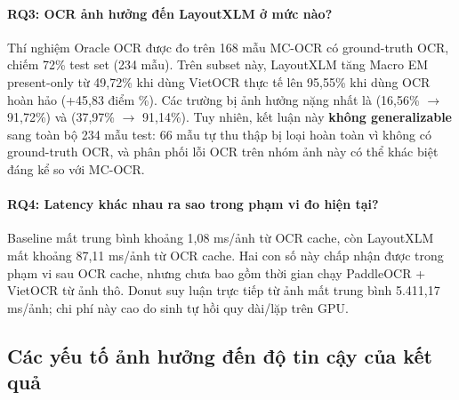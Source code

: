 \paragraph{RQ3: OCR ảnh hưởng đến LayoutXLM ở mức nào?}
Thí nghiệm Oracle OCR được đo trên 168 mẫu MC-OCR có ground-truth OCR, chiếm 72\% test set (234 mẫu). Trên subset này, LayoutXLM tăng Macro EM present-only từ 49,72\% khi dùng VietOCR thực tế lên 95,55\% khi dùng OCR hoàn hảo (+45,83 điểm \%). Các trường bị ảnh hưởng nặng nhất là  (16,56\% $\rightarrow$ 91,72\%) và  (37,97\% $\rightarrow$ 91,14\%). Tuy nhiên, kết luận này \textbf{không generalizable} sang toàn bộ 234 mẫu test: 66 mẫu tự thu thập bị loại hoàn toàn vì không có ground-truth OCR, và phân phối lỗi OCR trên nhóm ảnh này có thể khác biệt đáng kể so với MC-OCR.

\paragraph{RQ4: Latency khác nhau ra sao trong phạm vi đo hiện tại?}
Baseline mất trung bình khoảng 1,08 ms/ảnh từ OCR cache, còn LayoutXLM mất khoảng 87,11 ms/ảnh từ OCR cache. Hai con số này chấp nhận được trong phạm vi sau OCR cache, nhưng chưa bao gồm thời gian chạy PaddleOCR + VietOCR từ ảnh thô. Donut suy luận trực tiếp từ ảnh mất trung bình 5.411,17 ms/ảnh; chi phí này cao do sinh tự hồi quy dài/lặp trên GPU.

\subsection{Các yếu tố ảnh hưởng đến độ tin cậy của kết quả}
\label{subsec:limitations-and-threats}

